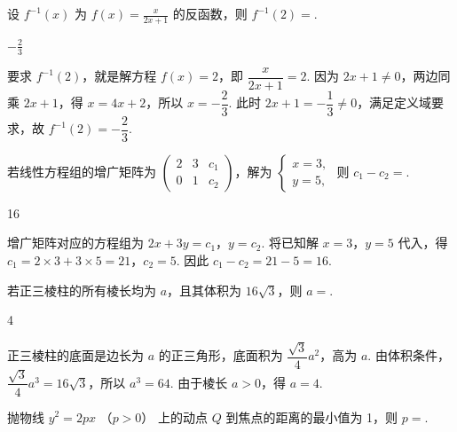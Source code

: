 \begin{problem}
设 \( f^{-1}(x) \) 为 \( f(x)=\frac{x}{2x+1} \) 的反函数，则 \( f^{-1}(2)= \)\fillinblank{}.
\end{problem}

\begin{answer}
\(-\frac{2}{3}\)
\end{answer}

\begin{solution}
要求 \(f^{-1}(2)\)，就是解方程 \(f(x)=2\)，即 \(\dfrac{x}{2x+1}=2\). 因为 \(2x+1\neq0\)，两边同乘 \(2x+1\)，得 \(x=4x+2\)，所以 \(x=-\dfrac23\). 此时 \(2x+1=-\dfrac13\neq0\)，满足定义域要求，故 \(f^{-1}(2)=-\dfrac23\).
\end{solution}

\begin{problem}
若线性方程组的增广矩阵为 \( \begin{pmatrix} 2 & 3 & c_{1} \\ 0 & 1 & c_{2} \end{pmatrix} \)，解为 \( \begin{cases}
x = 3,\\
y = 5,
\end{cases} \) 则 \( c_{1}-c_{2}= \)\fillinblank{}.
\end{problem}

\begin{answer}
16
\end{answer}

\begin{solution}
增广矩阵对应的方程组为 \(2x+3y=c_1\)，\(y=c_2\). 将已知解 \(x=3\)，\(y=5\) 代入，得 \(c_1=2\times3+3\times5=21\)，\(c_2=5\). 因此 \(c_1-c_2=21-5=16\).
\end{solution}

\begin{problem}
若正三棱柱的所有棱长均为 \(a\)，且其体积为 \(16\sqrt{3}\)，则 \(a = \)\fillinblank{}.
\end{problem}

\begin{answer}
4
\end{answer}

\begin{solution}
正三棱柱的底面是边长为 \(a\) 的正三角形，底面积为 \(\dfrac{\sqrt{3}}{4}a^2\)，高为 \(a\). 由体积条件，\(\dfrac{\sqrt{3}}{4}a^3=16\sqrt{3}\)，所以 \(a^3=64\). 由于棱长 \(a>0\)，得 \(a=4\).
\end{solution}

\begin{problem}
抛物线 \( y^{2}=2px \) （\(p>0\)） 上的动点 \(Q\) 到焦点的距离的最小值为 1，则 \(p=\)\fillinblank{}.
\end{problem}


